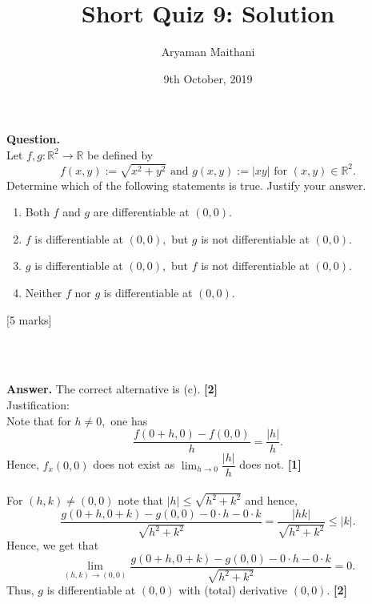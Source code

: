 \documentclass{article}
\title{Short Quiz 9: Solution}      %
\author{Aryaman Maithani}
\date{9th October, 2019}  		 %
\begin{document}
\maketitle

\hrulefill

\textbf{Question.} \\
Let $f, g : \mathbb{R}^2 \to \mathbb{R}$ be defined by
\[f(x, y) := \sqrt{x^2 + y^2} \text{ and } g(x, y) := |xy| \text{ for } (x, y) \in \mathbb{R}^2.\]
Determine which of the following statements is true. Justify your answer.
\begin{enumerate}[label = (\alph*)] 
 	\item Both $f$ and $g$ are differentiable at $(0, 0).$
 	\item $f$ is differentiable at $(0, 0),$ but $g$ is not differentiable at $(0, 0).$
 	\item $g$ is differentiable at $(0, 0),$ but $f$ is not differentiable at $(0, 0).$
 	\item Neither $f$ nor $g$ is differentiable at $(0, 0).$
 \end{enumerate} 
 \hfill [5 marks]
\begin{flushright}
	\\~\\
\end{flushright}

\hrulefill

\textbf{Answer.} The correct alternative is (c). \hfill \textbf{[2]}\\ 
Justification: \\
Note that for $h \neq 0,$ one has
\[\dfrac{f(0 + h, 0) - f(0, 0)}{h} = \dfrac{|h|}{h}.\]
Hence, $f_x(0, 0)$ does not exist as $\displaystyle\lim_{h\to 0}\dfrac{|h|}{h}$ does not. \hfill \textbf{[1]}\\~\\
%
For $(h, k) \neq (0, 0)$ note that $|h| \le \sqrt{h^2 + k^2}$ and hence,
\[\dfrac{g(0 + h, 0 + k) - g(0, 0) - 0\cdot h - 0\cdot k }{\sqrt{h^2 + k^2}} = \dfrac{|hk|}{\sqrt{h^2 + k^2}} \le |k|.\]
Hence, we get that \[\lim_{(h, k)\to (0, 0)}\dfrac{g(0 + h, 0 + k) - g(0, 0) - 0\cdot h - 0\cdot k }{\sqrt{h^2 + k^2}} = 0.\]
Thus, $g$ is differentiable at $(0, 0)$ with (total) derivative $(0, 0).$ \hfill \textbf{[2]}

\hrulefill

\vspace{0.2 cm}
\end{document}
